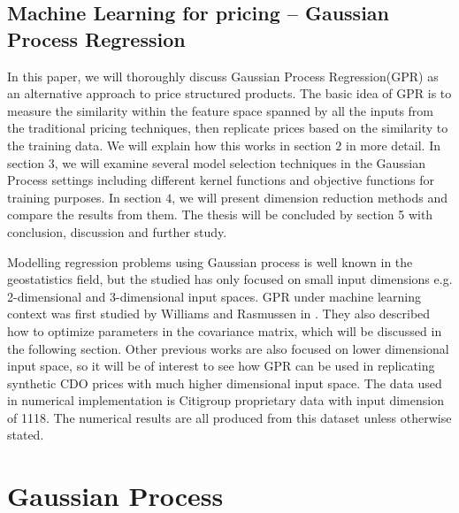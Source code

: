 \documentclass[11pt,a4paper]{article}
\theoremstyle{definition}
\numberwithin{equation}{section}
\begin{document}
	\subsection{Machine Learning for pricing -- Gaussian Process Regression}
	In this paper, we will thoroughly discuss Gaussian Process Regression(GPR) as an alternative approach to price structured products. The basic idea of GPR is to measure the similarity within the feature space spanned by all the inputs from the traditional pricing techniques, then replicate prices based on the similarity to the training data. We will explain how this works in section $2$ in more detail. In section $3$, we will examine several model selection techniques in the Gaussian Process settings including different kernel functions and objective functions for training purposes. In section $4$, we will present dimension reduction methods and compare the results from them. The thesis will be concluded by section 5 with conclusion, discussion and further study.
	
	Modelling regression problems using Gaussian process is well known in the geostatistics field\cite{matheron,JandH}, but the studied has only focused on small input dimensions e.g. 2-dimensional and 3-dimensional input spaces. GPR under machine learning context was first studied by Williams and Rasmussen in \cite{WandR_1}. They also described how to optimize parameters in the covariance matrix, which will be discussed in the following section. Other previous works are also focused on lower dimensional input space, so it will be of interest to see how GPR can be used in replicating synthetic CDO prices with much higher dimensional input space. The data used in numerical implementation is Citigroup proprietary data with input dimension of 1118. The numerical results are all produced from this dataset unless otherwise stated.
	
	
	\newpage
	\section{Gaussian Process}
	
\end{document}

